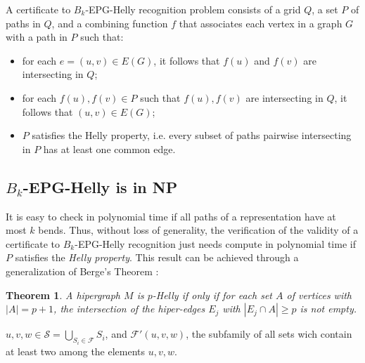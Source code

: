 \documentclass[a4paper,11pt]{article}
\newtheorem{theorem}{Theorem}
\begin{document}
A certificate to {\sc $B_k$-EPG-Helly recognition} problem consists of a grid $Q$, a set $P$ of paths in $Q$, and a combining function $f$ that associates each vertex in a graph $G$ with a path  in $P$ such that:

\begin{itemize}
\item for each $e=(u,v) \in E(G)$, it follows that $f(u)$ and $f(v)$ are intersecting in $Q$;
\item for each $f(u),f(v) \in P$ such that $f(u),f(v)$ are intersecting in $Q$, it follows that $(u,v) \in E(G)$;
\item $P$ satisfies the Helly property, i.e. every subset of paths pairwise intersecting in $P$ has at least one common edge.
\end{itemize}

\subsection{$B_k$-EPG-Helly is in NP}

It is easy to check in polynomial time if all paths of a representation have at most $k$ bends. Thus, without loss of generality, the verification of the validity of a certificate to $B_k$-EPG-Helly recognition just needs compute in polynomial time if $ P $ satisfies the  \textit{Helly property}. This result can be achieved through a generalization of Berge's Theorem \citep{bergeDuchet1975}:

\begin{theorem} \citep{bergeDuchet1975} A hipergraph $M$ is $p$-Helly  if only if for each set $A$ of vertices with $|A| = p+1$, the intersection of the hiper-edges $E_j$ with $|E_j \cap A|\geq p$ is not empty. 
\end{theorem}


$ \displaystyle  u,v,w \in \mathcal{S} = \bigcup _{S_i \in \mathcal{F}} S_i$, and $\mathcal{F'}(u,v,w)$, the subfamily of all sets wich contain at least two among the elements $u,v,w$. 

\end{document}
